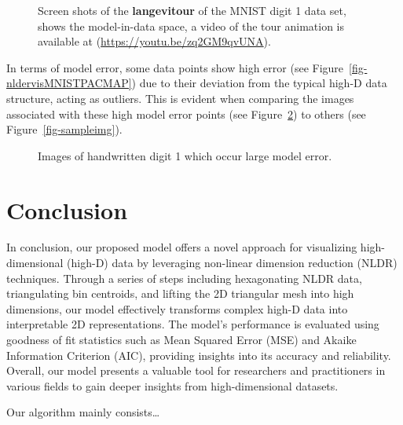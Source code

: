 \documentclass[
  12pt]{article}
\begin{document}
\begin{figure}[H]
\begin{minipage}{0.33\linewidth}
{}

\subcaption{\label{fig-mnist1-sc3}}

\end{minipage}%

\caption{\label{fig-mnist1-sc}Screen shots of the \textbf{langevitour}
of the MNIST digit 1 data set, shows the model-in-data space, a video of
the tour animation is available at
(\url{https://youtu.be/zq2GM9qvUNA}).}

\end{figure}%

In terms of model error, some data points show high error (see
Figure~\ref{fig-nldervisMNISTPACMAP}) due to their deviation from the
typical high-D data structure, acting as outliers. This is evident when
comparing the images associated with these high model error points (see
Figure~\ref{fig-sampleimgerror}) to others (see
Figure~\ref{fig-sampleimg}).

\begin{figure}[H]


\caption{\label{fig-sampleimgerror}Images of handwritten digit 1 which
occur large model error.}

\end{figure}%

\section{Conclusion}\label{sec-conclusions}

In conclusion, our proposed model offers a novel approach for
visualizing high-dimensional (high-D) data by leveraging non-linear
dimension reduction (NLDR) techniques. Through a series of steps
including hexagonating NLDR data, triangulating bin centroids, and
lifting the 2D triangular mesh into high dimensions, our model
effectively transforms complex high-D data into interpretable 2D
representations. The model's performance is evaluated using goodness of
fit statistics such as Mean Squared Error (MSE) and Akaike Information
Criterion (AIC), providing insights into its accuracy and reliability.
Overall, our model presents a valuable tool for researchers and
practitioners in various fields to gain deeper insights from
high-dimensional datasets.

Our algorithm mainly consists\ldots{}
\end{document}
